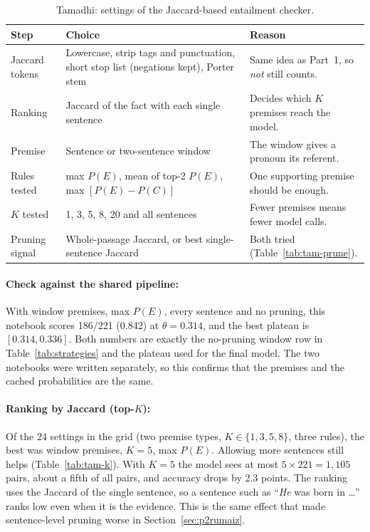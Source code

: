 \documentclass[12pt,a4paper]{article}
\begin{document}
\begin{table}[H]
\centering
\small
\begin{tabularx}{\linewidth}{L{3.0cm} L{4.6cm} Y}
\toprule
Step & Choice & Reason \\
\midrule
Jaccard tokens & Lowercase, strip tags and punctuation, short stop list (negations kept), Porter stem & Same idea as Part~1, so \textit{not} still counts. \\
Ranking & Jaccard of the fact with each single sentence & Decides which $K$ premises reach the model. \\
Premise & Sentence or two-sentence window & The window gives a pronoun its referent. \\
Rules tested & max $P(E)$, mean of top-2 $P(E)$, max $[P(E)-P(C)]$ & One supporting premise should be enough. \\
$K$ tested & 1, 3, 5, 8, 20 and all sentences & Fewer premises means fewer model calls. \\
Pruning signal & Whole-passage Jaccard, or best single-sentence Jaccard & Both tried (Table~\ref{tab:tam-prune}). \\
\bottomrule
\end{tabularx}
\caption{Tamadhi: settings of the Jaccard-based entailment checker.}
\label{tab:tam-setup}
\end{table}

\paragraph{Check against the shared pipeline:} With window premises, max $P(E)$, every sentence and no pruning, this notebook scores 186/221 (0.842) at $\theta = 0.314$, and the best plateau is $[0.314, 0.336]$. Both numbers are exactly the no-pruning window row in Table~\ref{tab:strategies} and the plateau used for the final model. The two notebooks were written separately, so this confirms that the premises and the cached probabilities are the same.

\paragraph{Ranking by Jaccard (top-$K$):} Of the 24 settings in the grid (two premise types, $K \in \{1,3,5,8\}$, three rules), the best was window premises, $K = 5$, max $P(E)$. Allowing more sentences still helps (Table~\ref{tab:tam-k}). With $K = 5$ the model sees at most $5 \times 221 = 1{,}105$ pairs, about a fifth of all pairs, and accuracy drops by 2.3 points. The ranking uses the Jaccard of the single sentence, so a sentence such as ``\emph{He} was born in \dots'' ranks low even when it is the evidence. This is the same effect that made sentence-level pruning worse in Section~\ref{sec:p2rumaiz}.
\end{document}
